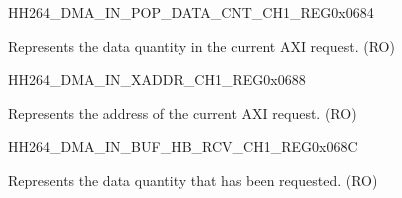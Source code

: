 \begin{register}{H}{H264\_DMA\_IN\_POP\_DATA\_CNT\_CH1\_REG}{0x0684}\label{regdesc:H264DMAINPOPDATACNTCH1REG}
%
%
\regnewline%
\begin{regdesc}\begin{reglist}
\label{fielddesc:H264DMAINCMDFIFOPOPDATACNTCH1}\item [H264\_DMA\_IN\_CMDFIFO\_POP\_DATA\_CNT\_CH1] Represents the data quantity in the current AXI request. (RO)
\end{reglist}\end{regdesc}
\end{register}


\begin{register}{H}{H264\_DMA\_IN\_XADDR\_CH1\_REG}{0x0688}\label{regdesc:H264DMAINXADDRCH1REG}
%
\regnewline%
\begin{regdesc}\begin{reglist}
\label{fielddesc:H264DMAINCMDFIFOXADDRCH1}\item [H264\_DMA\_IN\_CMDFIFO\_XADDR\_CH1] Represents the address of the current AXI request. (RO)
\end{reglist}\end{regdesc}
\end{register}


\begin{register}{H}{H264\_DMA\_IN\_BUF\_HB\_RCV\_CH1\_REG}{0x068C}\label{regdesc:H264DMAINBUFHBRCVCH1REG}
%
%
\regnewline%
\begin{regdesc}\begin{reglist}
\label{fielddesc:H264DMAINCMDFIFOBUFHBRCVCH1}\item [H264\_DMA\_IN\_CMDFIFO\_BUF\_HB\_RCV\_CH1] Represents the data quantity that has been requested. (RO)
\end{reglist}\end{regdesc}
\end{register}


